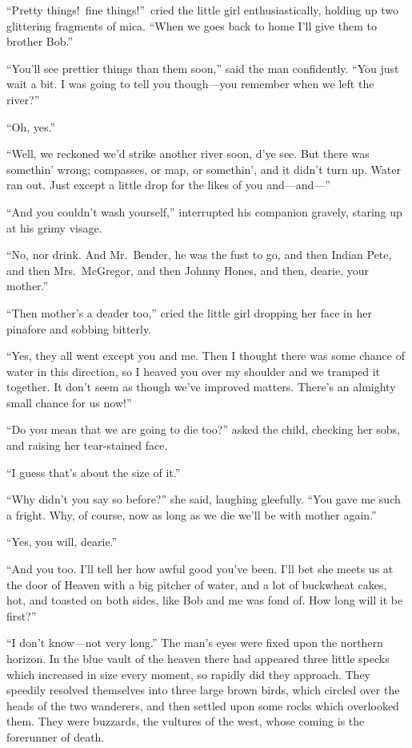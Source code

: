 \documentclass[12pt,english,oneside]{book}
\newcommand{\mdsh}[1]{\mbox{#1}\linebreak[1]}
\begin{document}
{}``Pretty things!\ fine things!''\ cried the little girl enthusiastically,
holding up two glittering fragments of mica. {}``When we goes back
to home I'll give them to brother Bob.''

{}``You'll see prettier things than them soon,'' said the man confidently.
{}``You just wait a bit. I was going to tell you though\mdsh{---}you
remember when we left the river?''

{}``Oh, yes.''

{}``Well, we reckoned we'd strike another river soon, d'ye see. But
there was somethin' wrong; compasses, or map, or somethin', and it
didn't turn up. Water ran out. Just except a little drop for the likes
of you and\mdsh{---}and\mbox{---}''

{}``And you couldn't wash yourself,'' interrupted his companion
gravely, staring up at his grimy visage.

{}``No, nor drink. And Mr.\ Bender, he was the fust to go, and then
Indian Pete, and then Mrs.\ McGregor, and then Johnny Hones, and
then, dearie, your mother.''

{}``Then mother's a deader too,'' cried the little girl dropping
her face in her pinafore and sobbing bitterly.

{}``Yes, they all went except you and me. Then I thought there was
some chance of water in this direction, so I heaved you over my shoulder
and we tramped it together. It don't seem as though we've improved
matters. There's an almighty small chance for us now!''

{}``Do you mean that we are going to die too?'' asked the child,
checking her sobs, and raising her tear-stained face.

{}``I guess that's about the size of it.''

{}``Why didn't you say so before?'' she said, laughing gleefully.
{}``You gave me such a fright. Why, of course, now as long as we
die we'll be with mother again.''

{}``Yes, you will, dearie.''

{}``And you too. I'll tell her how awful good you've been. I'll bet
she meets us at the door of Heaven with a big pitcher of water, and
a lot of buckwheat cakes, hot, and toasted on both sides, like Bob
and me was fond of. How long will it be first?''

{}``I don't know\mdsh{---}not very long.'' The man's eyes were
fixed upon the northern horizon. In the blue vault of the heaven there
had appeared three little specks which increased in size every moment,
so rapidly did they approach. They speedily resolved themselves into
three large brown birds, which circled over the heads of the two wanderers,
and then settled upon some rocks which overlooked them. They were
buzzards, the vultures of the west, whose coming is the forerunner
of death.
\end{document}
